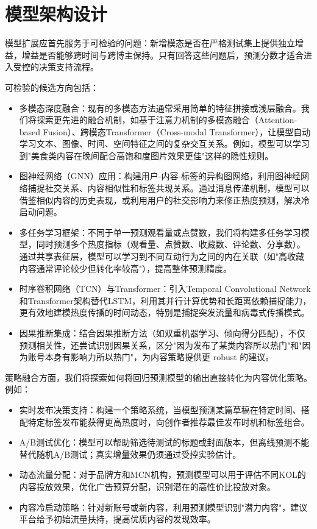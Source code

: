\section{模型架构设计}

模型扩展应首先服务于可检验的问题：新增模态是否在严格测试集上提供独立增益，增益是否能够跨时间与跨博主保持。只有回答这些问题后，预测分数才适合进入受控的决策支持流程。

可检验的候选方向包括：

\begin{itemize}
	\item 多模态深度融合：现有的多模态方法通常采用简单的特征拼接或浅层融合。我们将探索更先进的融合机制，如基于注意力机制的多模态融合（Attention-based Fusion）、跨模态Transformer（Cross-modal Transformer），让模型自动学习文本、图像、时间、空间特征之间的复杂交互关系。例如，模型可以学习到"美食类内容在晚间配合高饱和度图片效果更佳"这样的隐性规则。
	
	\item 图神经网络（GNN）应用：构建用户-内容-标签的异构图网络，利用图神经网络捕捉社交关系、内容相似性和标签共现关系。通过消息传递机制，模型可以借鉴相似内容的历史表现，或利用用户的社交影响力来修正热度预测，解决冷启动问题。
	
	\item 多任务学习框架：不同于单一预测观看量或点赞数，我们将构建多任务学习模型，同时预测多个热度指标（观看量、点赞数、收藏数、评论数、分享数）。通过共享表征层，模型可以学习到不同互动行为之间的内在关联（如"高收藏内容通常评论较少但转化率较高"），提高整体预测精度。
	
	\item 时序卷积网络（TCN）与Transformer：引入Temporal Convolutional Network和Transformer架构替代LSTM，利用其并行计算优势和长距离依赖捕捉能力，更有效地建模热度传播的时间动态，特别是捕捉突发流量和病毒式传播模式。
	
	\item 因果推断集成：结合因果推断方法（如双重机器学习、倾向得分匹配），不仅预测相关性，还尝试识别因果关系，区分"因为发布了某类内容所以热门"和"因为账号本身有影响力所以热门"，为内容策略提供更 robust 的建议。
\end{itemize}

策略融合方面，我们将探索如何将回归预测模型的输出直接转化为内容优化策略。例如：

\begin{itemize}
	\item 实时发布决策支持：构建一个策略系统，当模型预测某篇草稿在特定时间、搭配特定标签发布能获得更高热度时，向创作者推荐最佳发布时机和标签组合。
	
	\item A/B测试优化：模型可以帮助筛选待测试的标题或封面版本，但离线预测不能替代随机A/B测试；真实增量效果仍须通过受控实验估计。
	
	\item 动态流量分配：对于品牌方和MCN机构，预测模型可以用于评估不同KOL的内容投放效果，优化广告预算分配，识别潜在的高性价比投放对象。
	
	\item 内容冷启动策略：针对新账号或新内容，利用预测模型识别"潜力内容"，建议平台给予初始流量扶持，提高优质内容的发现效率。
\end{itemize}

